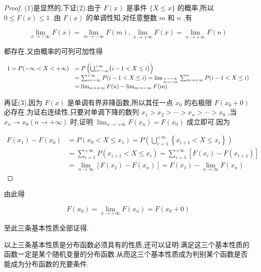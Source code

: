 \begin{proof}
	(1)是显然的,下证(2).由于 $ F(x) $ 是事件 $ \{X \leqslant x\} $ 的概率,所以 $ 0\leq 
	F(x)\leq 1 $ .由 $ F(x) $ 的单调性知,对任意整数 $ m $ 和 $ n $ ,有
	
	\[ 
	\lim _{x \rightarrow-\infty} F(x)=\lim _{m \rightarrow-\infty} F(m), \lim _{x \rightarrow+\infty} F(x)=\lim _{n \rightarrow+\infty} F(n)
	\]
	
	都存在.又由概率的可列可加性得
	
	\[ 
	\begin{array}{ll}
	1=P(-\infty<X<+\infty)&=P\left(\bigcup_{i=-\infty}^{+\infty}\{i-1<X \leqslant i\}\right) \\ 
	&=\sum_{i=-\infty}^{+\infty} P(i-1<X \leqslant i)=\lim _{n \rightarrow+\infty \atop m \rightarrow-\infty} \sum_{m \rightarrow+\infty}^{n} P(i-1<X \leqslant i) \\ 
	&=\lim _{n \rightarrow+\infty} F(n)-\lim _{m \rightarrow-\infty} F(m)
	\end{array}
	\]
	
	再证(3),因为 $ F(x) $ 是单调有界非降函数,所以其任一点 $ x_0 $ 的右极限 $ F(x_0+0) $ 必存在.为证右连续性,只要对单调下降的数列 $ x_{1}>x_{2}>\cdots>x_{n}>\cdots>x_{0} $ ,当 $ x_{n} \rightarrow x_{0}(n \rightarrow+\infty) $ 时,证明 $ \lim _{n \rightarrow+\infty} F\left(x_{n}\right)=F\left(x_{0}\right) $ 成立即可.因为
	
	\[ \begin{array}{ll}
	F\left(x_{1}\right)-F\left(x_{0}\right)&=P\left(x_{0}<X \leqslant x_{1}\right)=P\left(\bigcup_{r=1}^{+\infty}\left\{x_{i+1}<X \leqslant x_{i}\right\}\right) \\
	&=\sum_{i=1}^{+\infty} P\left(x_{i+1}<X \leqslant x_{i}\right)=\sum_{i=1}^{+\infty}\left[F\left(x_{i}\right)-F\left(x_{t+1}\right)\right] \\
	&=\lim _{n \rightarrow \infty}\left[F\left(x_{1}\right)-F\left(x_{n}\right)\right]=F\left(x_{1}\right)-\lim _{n \rightarrow \infty} F\left(x_{n}\right)
	\end{array}\]
\end{proof}

由此得

\[ 
F\left(x_{0}\right)=\lim _{x \rightarrow+\infty} F\left(x_{n}\right)=F\left(x_{0}+0\right)
\]

至此三条基本性质全部证得.

以上三条基本性质是分布函数必须具有的性质,还可以证明:满足这三个基本性质的函数一定是某个随机变量的分布函数.从而这三个基本性质成为判别某个函数是否能成为分布函数的充要条件.

